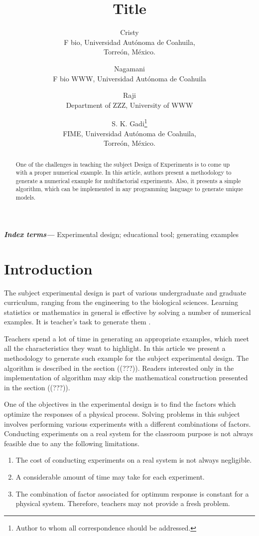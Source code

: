 \documentclass[letterpaper, 12pt]{article}
\title{\bf Title}
\author{Cristy\\ F bio, Universidad Autónoma de Coahuila,\\ Torreón, México.
	\and
	Nagamani \\
	F bio WWW, Universidad Autónoma de Coahuila
	\and
	Raji \\
	Department of ZZZ, University of WWW
	\and
	S. K. Gadi\thanks{Author to whom all correspondence should be addressed.} \\
	FIME, Universidad Autónoma de Coahuila,\\ Torreón, México.
}
\providecommand{\keywords}[1]{\textbf{\textit{Index terms---}} #1}
\begin{document}
\maketitle
\begin{abstract}
	One of the challenges in teaching the subject Design of Experiments is to come up with a proper numerical example. In this article, authors present a methodology to generate a numerical example for multifactorial experiments. Also, it presents a simple algorithm, which can be implemented in any programming language to generate unique models.
\end{abstract}
\keywords{Experimental design; educational tool; generating examples}
\section{Introduction}
The subject experimental design is part of various undergraduate and graduate curriculum, ranging from the engineering to the biological sciences. Learning statistics or mathematics in general is effective by solving a number of numerical examples. It is teacher's task to generate them \cite{Deborah2008}.
\par
Teachers spend a lot of time in generating an appropriate examples, which meet all the characteristics they want to highlight. In this article we present a methodology to generate such example for the subject experimental design. The algorithm is described in the section ((???)). Readers interested only in the implementation of algorithm may skip the mathematical construction presented in the section ((???)).
\par
One of the objectives in the experimental design is to find the factors which optimize the responses of a physical process. Solving problems in this subject involves performing various experiments with a different combinations of factors. Conducting experiments on a real system for the classroom purpose is not always feasible due to any the following limitations.
\begin{enumerate}
	\item The cost of conducting experiments on a real system is not always negligible.
	\item A considerable amount of time may take for each experiment.
	\item The combination of factor associated for optimum response is constant for a physical system. Therefore, teachers may not provide a fresh problem.
\end{enumerate}
\par
\end{document}
